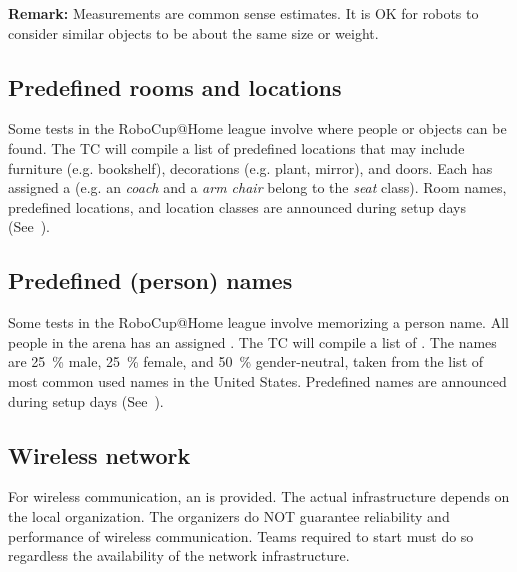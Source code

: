 \noindent\textbf{Remark:} Measurements are common sense estimates.
It is OK for robots to consider similar objects to be about the same size or weight.

%
%

\subsection{Predefined rooms and locations}
\label{rule:scenario_locations}
Some tests in the RoboCup@Home league involve  where people or objects can be found.
The TC will compile a list of predefined locations that may include furniture (e.g. bookshelf), decorations (e.g. plant, mirror), and doors.
Each  has assigned a  (e.g. an \textit{coach} and a \textit{arm chair} belong to the \textit{seat} class).
Room names, predefined locations, and location classes are announced during setup days (See~).



\subsection{Predefined (person) names}\label{rule:scenario_names}
Some tests in the RoboCup@Home league involve memorizing a person name.
All people in the arena has an assigned .
The TC will compile a list of \NumNames {}.
The names are \SI{25}{\percent} male, \SI{25}{\percent} female, and \SI{50}{\percent} gender-neutral, taken from the list of most common used names in the United States.
Predefined names are announced during setup days (See~).


\subsection{Wireless network}
\label{rule:scenario_wifi}

For wireless communication, an  is provided. The actual infrastructure depends on the local organization.
The organizers do NOT guarantee reliability and performance of wireless communication.
Teams required to start must do so regardless the availability of the network infrastructure.

